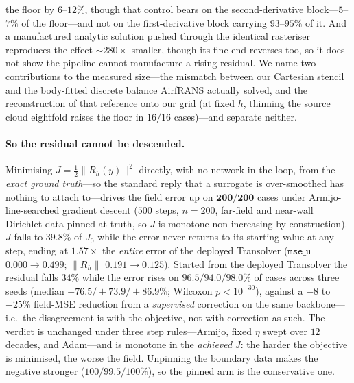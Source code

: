 the floor by $6$--$12\%$, though that control bears on the second-derivative block---$5$--$7\%$
of the floor---and not on the first-derivative block carrying $93$--$95\%$ of it. And a
manufactured analytic solution pushed through the identical rasteriser reproduces the
effect ${\sim}280\times$ smaller, though its fine end reverses too, so it does not show the
pipeline cannot manufacture a rising residual. We name two
contributions to the measured size---the mismatch between our Cartesian stencil and the
body-fitted discrete balance AirfRANS actually solved, and the reconstruction of that
reference onto our grid (at fixed $h$, thinning the source cloud eightfold raises the floor
in $16/16$ cases)---and separate neither.

\paragraph{So the residual cannot be descended.} Minimising $J=\tfrac12\|R_h(y)\|^2$
directly, with no network in the loop, from the \emph{exact ground truth}---so the standard
reply that a surrogate is over-smoothed has nothing to attach to---drives the field error
up on $\mathbf{200/200}$ cases under Armijo-line-searched gradient descent ($500$ steps,
$n=200$, far-field and near-wall Dirichlet data pinned at truth, so $J$ is monotone
non-increasing by construction). $J$ falls to $39.8\%$ of $J_0$ while the error never
returns to its starting value at any step, ending at $1.57\times$ the \emph{entire} error
of the deployed Transolver ($\texttt{mse\_u}$ $0.000\to0.499$; $\|R_h\|$
$0.191\to0.125$). Started from the deployed Transolver the residual falls $34\%$ while the
error rises on $\mathbf{96.5/94.0/98.0\%}$ of cases across three seeds (median
$+76.5/+73.9/+86.9\%$; Wilcoxon $p<10^{-30}$), against a $-8$ to $-25\%$ field-MSE
reduction from a \emph{supervised} correction on the same backbone---i.e.\ the
disagreement is with the objective, not with correction as such. The verdict is unchanged
under three step
rules---Armijo, fixed $\eta$ swept over $12$ decades, and Adam---and is monotone in the
\emph{achieved} $J$: the harder the objective is minimised, the worse the field. Unpinning
the boundary data makes the negative stronger ($100/99.5/100\%$), so the pinned arm is the
conservative one.

